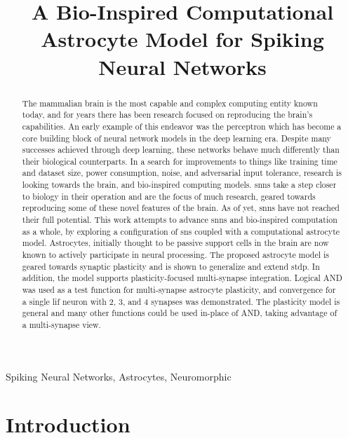 \documentclass[conference]{IEEEtran}
\title{A Bio-Inspired Computational Astrocyte Model for Spiking Neural Networks}
\author{\IEEEauthorblockN{Anonymous Authors}}
\begin{document}
\maketitle

\begin{abstract}
The mammalian brain is the most capable and complex computing entity known
today, and for years there has been research focused on reproducing the brain's
capabilities. An early example of this endeavor was the perceptron which has
become a core building block of neural network models in the deep learning
era. Despite many successes achieved through deep learning, these networks
behave much differently than their biological counterparts. In a search for
improvements to things like training time and dataset size, power consumption,
noise, and adversarial input tolerance, research is looking towards the brain,
and bio-inspired computing models. \Glspl{snn} take a step closer to biology in
their operation and are the focus of much research, geared towards reproducing
some of these novel features of the brain. As of yet, \glspl{snn} have not reached
their full potential. This work attempts to advance \glspl{snn} and bio-inspired
computation as a whole, by exploring a configuration of \glspl{sn} coupled with
a computational astrocyte model. Astrocytes, initially thought to be passive
support cells in the brain are now known to actively participate in neural
processing. The proposed astrocyte model is geared towards synaptic plasticity
and is shown to generalize and extend \gls{stdp}. In addition, the model
supports plasticity-focused multi-synapse integration. Logical AND was used as a
test function for multi-synapse astrocyte plasticity, and convergence for a
single \gls{lif} neuron with 2, 3, and 4 synapses was demonstrated. The
plasticity model is general and many other functions could be used in-place of
AND, taking advantage of a multi-synapse view.

\end{abstract}

\begin{IEEEkeywords}
Spiking Neural Networks, Astrocytes, Neuromorphic
\end{IEEEkeywords}

\section{Introduction}
\end{document}
